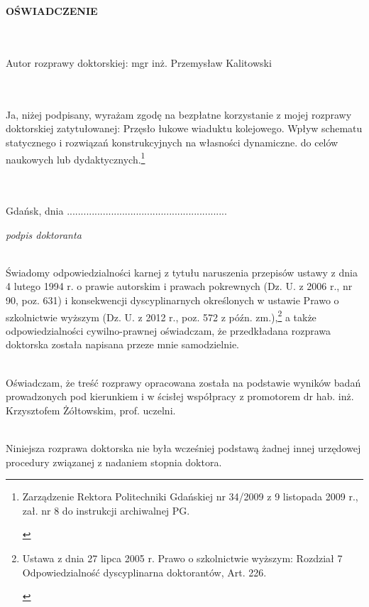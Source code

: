 \begin{myfont}

\noindent
\\ \\	
\textbf{OŚWIADCZENIE}

\footnotesize
\noindent
\\ \\
Autor rozprawy doktorskiej: mgr inż. Przemysław Kalitowski

\noindent
\\ \\
Ja, niżej podpisany, wyrażam zgodę na bezpłatne korzystanie z mojej rozprawy doktorskiej zatytułowanej: 
Przęsło łukowe wiaduktu kolejowego. Wpływ schematu statycznego i rozwiązań konstrukcyjnych na własności dynamiczne.
\noindent
do celów naukowych lub dydaktycznych.\footnote{\begin{myfont}\scriptsize 
	Zarządzenie Rektora Politechniki Gdańskiej nr 34/2009 z 9 listopada 2009 r., zał. nr 8 do instrukcji archiwalnej PG.\end{myfont}}

\noindent
\\ \\
Gdańsk, dnia .............................\hfill.............................

\scriptsize \noindent
\null\hfill \textit{podpis doktoranta}


\footnotesize \noindent
\\
Świadomy odpowiedzialności karnej z tytułu naruszenia przepisów ustawy z dnia 4 lutego 1994 r. o prawie autorskim i prawach pokrewnych (Dz. U. z 2006 r., nr 90, poz. 631) i konsekwencji dyscyplinarnych określonych w ustawie Prawo o szkolnictwie wyższym (Dz. U. z 2012 r., poz. 572 z późn. zm.),\footnote{\begin{myfont}\scriptsize Ustawa z dnia 27 lipca 2005 r. Prawo o szkolnictwie wyższym: Rozdział 7 Odpowiedzialność dyscyplinarna doktorantów, Art. 226.
\end{myfont}}
a także odpowiedzialności cywilno-prawnej oświadczam, że przedkładana rozprawa doktorska została napisana przeze mnie samodzielnie.

\footnotesize \noindent
\\
Oświadczam, że treść rozprawy opracowana została na podstawie wyników badań prowadzonych pod kierunkiem i w ścisłej współpracy z promotorem dr hab. inż. Krzysztofem Żółtowskim, prof. uczelni.

\noindent
\\
Niniejsza rozprawa doktorska nie była wcześniej podstawą żadnej innej urzędowej procedury związanej z nadaniem stopnia doktora. 


\end{myfont}
